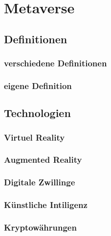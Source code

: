 \chapter{Metaverse}\label{ch:Metaverse}

\section{Definitionen}

\subsection{verschiedene Definitionen}

\subsection{eigene Definition}

\section{Technologien}

\subsection{Virtuel Reality}
\subsection{Augmented Reality}
\subsection{Digitale Zwillinge}
\subsection{Künstliche Intiligenz}
\subsection{Kryptowährungen}




